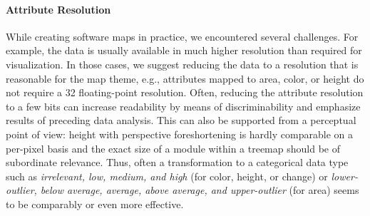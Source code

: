\documentclass[sigconf]{acmart}
\def\eg{e.g., }
\begin{document}
\paragraph{Attribute Resolution}
While creating software maps in practice, we encountered several challenges.
For example, the data is usually available in much higher resolution than required for visualization.
In those cases, we suggest reducing the data to a resolution that is reasonable for the map theme, \eg attributes mapped to area, color, or height do not require a \SI{32}{\bit} floating-point resolution.
Often, reducing the attribute resolution to a few bits can increase readability by means of discriminability and emphasize results of preceding data analysis.
This can also be supported from a perceptual point of view: height with perspective foreshortening is hardly comparable on a per-pixel basis and the exact size of a module within a treemap should be of subordinate relevance.
Thus, often a transformation to a categorical data type such as \emph{irrelevant, low, medium, and high} (for color, height, or change) or \emph{lower-outlier, below average, average, above average, and upper-outlier} (for area) seems to be comparably or even more effective.
\end{document}
